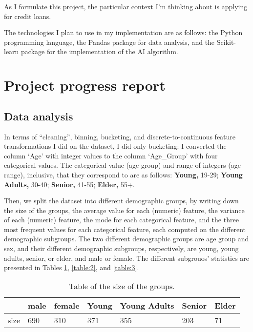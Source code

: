 \documentclass[conference]{IEEEtran}
\begin{document}
As I formulate this project, the particular context I'm thinking about is applying for credit loans.

The technologies I plan to use in my implementation are as follows: the Python programming language, the Pandas package for data analysis, and the Scikit-learn package for the implementation of the AI algorithm.
\newpage 

\section{Project progress report}
\subsection{Data analysis}
In terms of ``cleaning'', binning, bucketing, and discrete-to-continuous feature transformations I did on the dataset, I did only bucketing: I converted the column `Age' with integer values to the column `Age\_Group' with four categorical values. The categorical value (age group) and range of integers (age range), inclusive, that they correspond to are as follows: \textbf{Young,} 19-29; \textbf{Young Adults,} 30-40; \textbf{Senior,} 41-55; \textbf{Elder,} 55+.

Then, we split the dataset into different demographic groups, by writing down the size of the groups, the average value for each (numeric) feature, the variance of each (numeric) feature, the mode for each categorical feature, and the three most frequent values for each categorical feature, each computed on the different demographic subgroups. The two different demographic groups are age group and sex, and their different demographic subgroups, respectively, are young, young adults, senior, or elder, and male or female. The different subgrouos' statistics are presented in Tables \ref{table:1}, \ref{table:2}, and \ref{table:3}.

\begin{table}[h]
\begin{center}
\caption{Table of the size of the groups.}
\begin{tabularx}{0.49\textwidth} { |X|X|X|X|X|X|X| } 
    \hline
            & male & female & Young & Young Adults & Senior & Elder \\ 
        \hline
        size & 690  & 310    & 371   & 355          & 203    & 71    \\
        \hline
\end{tabularx}
\label{table:1}
\end{center}
\end{table}
\end{document}
